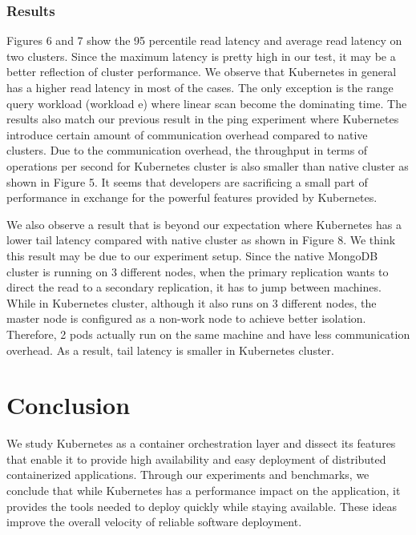 \documentclass[sigconf]{acmart}
\begin{document}
\subsubsection{Results}
Figures 6 and 7 show the 95 percentile read latency and average read latency on two clusters. Since the maximum latency is pretty high in our test, it may be a better reflection of cluster performance. We observe that Kubernetes in general has a higher read latency in most of the cases. The only exception is the range query workload (workload e) where linear scan become the dominating time. The results also match our previous result in the ping experiment where Kubernetes introduce certain amount of communication overhead compared to native clusters. Due to the communication overhead, the throughput in terms of operations per second for Kubernetes cluster is also smaller than native cluster as shown in Figure 5. It seems that developers are sacrificing a small part of performance in exchange for the powerful features provided by Kubernetes.

We also observe a result that is beyond our expectation where Kubernetes has a lower tail latency compared with native cluster as shown in Figure 8. We think this result may be due to our experiment setup. Since the native MongoDB cluster is running on 3 different nodes, when the primary replication wants to direct the read to a secondary replication, it has to jump between machines. While in Kubernetes cluster, although it also runs on 3 different nodes, the master node is configured as a non-work node to achieve better isolation. Therefore, 2 pods actually run on the same machine and have less communication overhead. As a result, tail latency is smaller in Kubernetes cluster.

\section{Conclusion}
We study Kubernetes as a container orchestration layer and dissect its features that enable it to provide high availability and easy deployment of distributed containerized applications. Through our experiments and benchmarks, we conclude that while Kubernetes has a performance impact on the application, it provides the tools needed to deploy quickly while staying available. These ideas improve the overall velocity of reliable software deployment.




\end{document}
